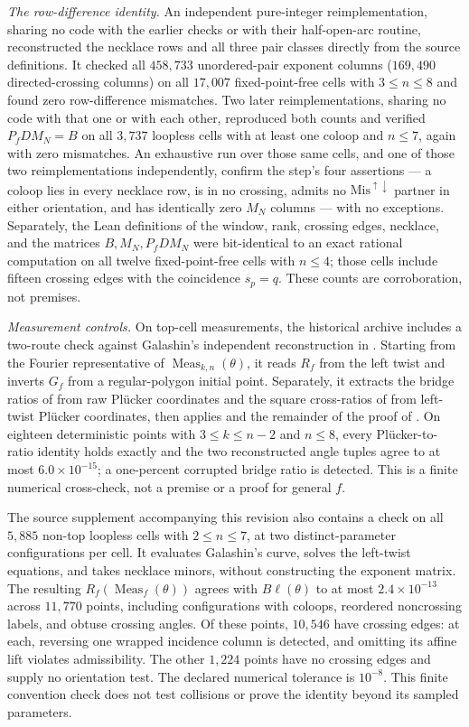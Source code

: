 \documentclass[11pt]{article}
\theoremstyle{definition}
\DeclareMathOperator{\Meas}{Meas}
\begin{document}
\emph{The row-difference identity.} An independent pure-integer reimplementation, sharing no code with
the earlier checks or with their half-open-arc routine, reconstructed the necklace rows and all three pair classes directly from the source definitions. It
checked all $458{,}733$ unordered-pair exponent columns ($169{,}490$ directed-crossing columns) on all
$17{,}007$ fixed-point-free cells with $3\le n\le8$ and found zero row-difference mismatches. Two later
reimplementations, sharing no code with that one or with each other, reproduced both counts and verified
$P_fDM_N=B$ on all $3{,}737$ loopless cells with at least one coloop and $n\le7$, again with zero
mismatches. An exhaustive run over those same cells, and one of those two
reimplementations independently, confirm the step's four assertions --- a coloop lies
in every necklace row, is in no crossing, admits no $\mathrm{Mis}^{\uparrow\downarrow}$ partner in either
orientation, and has identically zero $M_N$ columns --- with no exceptions. Separately,
the Lean definitions of the window, rank, crossing edges, necklace, and the matrices
$B,M_N,P_fDM_N$ were bit-identical to an exact rational computation on all twelve fixed-point-free
cells with $n\le4$; those cells include fifteen crossing edges with the coincidence $s_p=q$. These counts are corroboration, not premises.

\emph{Measurement controls.} On top-cell measurements, the historical archive includes a two-route check against Galashin's
independent reconstruction in \cite[\S9]{Galashin}. Starting from the Fourier representative of
$\Meas_{k,n}(\theta)$, it reads $R_f$ from the left twist and inverts $G_f$ from a regular-polygon
initial point. Separately, it extracts the bridge ratios of \cite[eq.~(9.4)]{Galashin} from raw Pl\"ucker
coordinates and the square cross-ratios of \cite[eq.~(9.3)]{Galashin} from left-twist Pl\"ucker coordinates,
then applies \cite[Lem.~9.3]{Galashin} and the remainder of the proof of \cite[Thm.~4.4]{Galashin}. On eighteen deterministic
points with $3\le k\le n-2$ and $n\le8$, every Pl\"ucker-to-ratio identity holds exactly and the two
reconstructed angle tuples agree to at most \(6.0\times10^{-15}\); a one-percent corrupted bridge
ratio is detected. This is a finite numerical cross-check, not a premise or a proof for general $f$.

The source supplement accompanying this revision also contains a check on all $5{,}885$
non-top loopless cells with $2\le n\le7$, at two distinct-parameter configurations per cell.
It evaluates Galashin's curve, solves the left-twist equations, and takes necklace minors,
without constructing the exponent matrix. The resulting $R_f(\Meas_f(\theta))$ agrees with
$B\ell(\theta)$ to at most $2.4\times10^{-13}$ across $11{,}770$ points, including
configurations with coloops, reordered noncrossing labels, and obtuse crossing angles.
Of these points, $10{,}546$ have crossing edges: at each, reversing one wrapped incidence
column is detected, and omitting its affine lift violates admissibility. The other
$1{,}224$ points have no crossing edges and supply no orientation test. The declared
numerical tolerance is $10^{-8}$. This finite convention check does not test collisions
or prove the identity beyond its sampled parameters.
\end{document}
